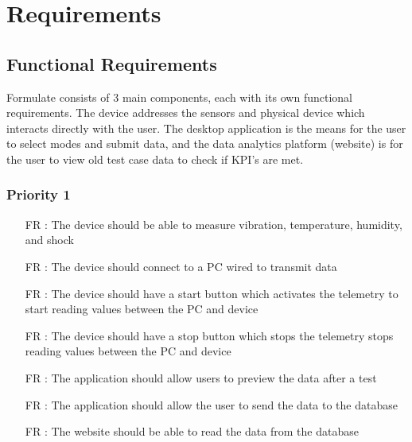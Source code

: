 \documentclass[12pt]{article}
\newcounter{reqnum} %
\begin{document}
\section{Requirements}

\subsection{Functional Requirements}
Formulate consists of 3 main components, each with its own functional requirements. The device addresses the sensors and physical device which interacts directly with the user. The desktop application is the means for the user to select modes and submit data, and the data analytics platform (website) is for the user to view old test case data to check if KPI's are met.

\subsubsection{Priority 1} 

\begin{itemize}
  
  \item[FR \refstepcounter{reqnum}\thereqnum:] The device should be able to measure vibration, temperature, humidity, and shock
  
  \item[FR \refstepcounter{reqnum}\thereqnum:] The device should connect to a PC wired to transmit data
  
  \item[FR \refstepcounter{reqnum}\thereqnum:] The device should have a start button which activates the telemetry to start reading values between the PC and device 
  
  \item[FR \refstepcounter{reqnum}\thereqnum:] The device should have a stop button which stops the telemetry stops reading values between the PC and device
  
  \item[FR \refstepcounter{reqnum}\thereqnum:] The application should allow users to preview the data after a test

  \item[FR \refstepcounter{reqnum}\thereqnum:] The application should allow the user to send the data to the database
  
  \item[FR \refstepcounter{reqnum}\thereqnum:] The website should be able to read the data from the database
  
  \end{itemize}
\end{document}

